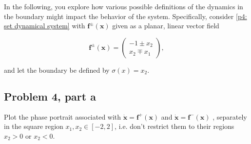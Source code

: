     \jump
    In the following, you explore how various possible definitions of the dynamics in the boundary might impact the behavior of the system. Specifically, consider \ref{p4: set dynamical system} with $\textbf{f}^\pm(\textbf{x})$ given as a planar, linear vector field

    \[
    \textbf{f}^\pm (\textbf{x}) = \begin{pmatrix}
         -1 \pm x_2\\
         x_2 \mp x_1
    \end{pmatrix},
    \]

    and let the boundary be defined by $\sigma(x) = x_2$.

\subsection{Problem 4, part a}
Plot the phase portrait associated with $\dot{\textbf{x}} = \textbf{f}^+(\textbf{x})$ and $\dot{\textbf{x}} = \textbf{f}^-(\textbf{x})$ , separately in the square region $x_1, x_2 \in [-2, 2]$, i.e. don’t restrict them to their regions $x_2 > 0$ or $x_2 < 0$.

